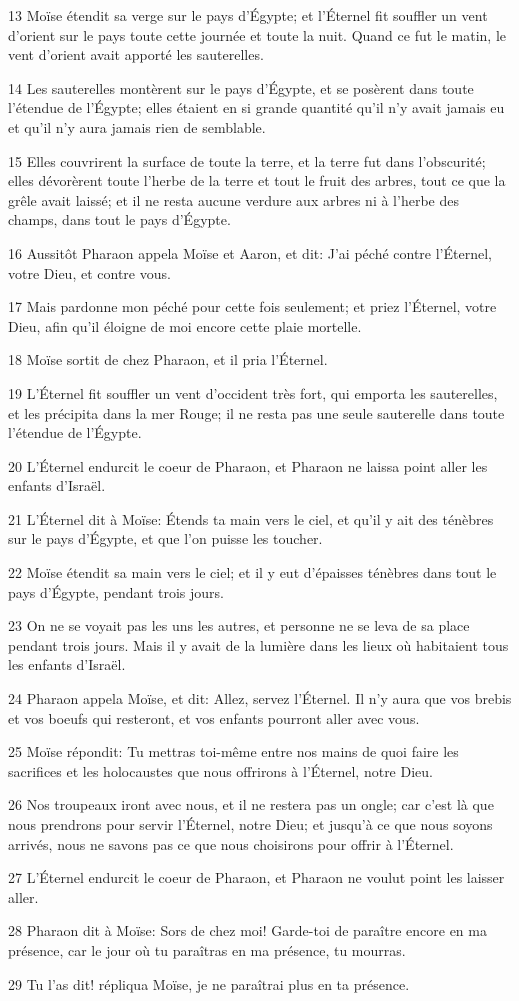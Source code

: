 \par 13 Moïse étendit sa verge sur le pays d'Égypte; et l'Éternel fit souffler un vent d'orient sur le pays toute cette journée et toute la nuit. Quand ce fut le matin, le vent d'orient avait apporté les sauterelles.
\par 14 Les sauterelles montèrent sur le pays d'Égypte, et se posèrent dans toute l'étendue de l'Égypte; elles étaient en si grande quantité qu'il n'y avait jamais eu et qu'il n'y aura jamais rien de semblable.
\par 15 Elles couvrirent la surface de toute la terre, et la terre fut dans l'obscurité; elles dévorèrent toute l'herbe de la terre et tout le fruit des arbres, tout ce que la grêle avait laissé; et il ne resta aucune verdure aux arbres ni à l'herbe des champs, dans tout le pays d'Égypte.
\par 16 Aussitôt Pharaon appela Moïse et Aaron, et dit: J'ai péché contre l'Éternel, votre Dieu, et contre vous.
\par 17 Mais pardonne mon péché pour cette fois seulement; et priez l'Éternel, votre Dieu, afin qu'il éloigne de moi encore cette plaie mortelle.
\par 18 Moïse sortit de chez Pharaon, et il pria l'Éternel.
\par 19 L'Éternel fit souffler un vent d'occident très fort, qui emporta les sauterelles, et les précipita dans la mer Rouge; il ne resta pas une seule sauterelle dans toute l'étendue de l'Égypte.
\par 20 L'Éternel endurcit le coeur de Pharaon, et Pharaon ne laissa point aller les enfants d'Israël.
\par 21 L'Éternel dit à Moïse: Étends ta main vers le ciel, et qu'il y ait des ténèbres sur le pays d'Égypte, et que l'on puisse les toucher.
\par 22 Moïse étendit sa main vers le ciel; et il y eut d'épaisses ténèbres dans tout le pays d'Égypte, pendant trois jours.
\par 23 On ne se voyait pas les uns les autres, et personne ne se leva de sa place pendant trois jours. Mais il y avait de la lumière dans les lieux où habitaient tous les enfants d'Israël.
\par 24 Pharaon appela Moïse, et dit: Allez, servez l'Éternel. Il n'y aura que vos brebis et vos boeufs qui resteront, et vos enfants pourront aller avec vous.
\par 25 Moïse répondit: Tu mettras toi-même entre nos mains de quoi faire les sacrifices et les holocaustes que nous offrirons à l'Éternel, notre Dieu.
\par 26 Nos troupeaux iront avec nous, et il ne restera pas un ongle; car c'est là que nous prendrons pour servir l'Éternel, notre Dieu; et jusqu'à ce que nous soyons arrivés, nous ne savons pas ce que nous choisirons pour offrir à l'Éternel.
\par 27 L'Éternel endurcit le coeur de Pharaon, et Pharaon ne voulut point les laisser aller.
\par 28 Pharaon dit à Moïse: Sors de chez moi! Garde-toi de paraître encore en ma présence, car le jour où tu paraîtras en ma présence, tu mourras.
\par 29 Tu l'as dit! répliqua Moïse, je ne paraîtrai plus en ta présence.

